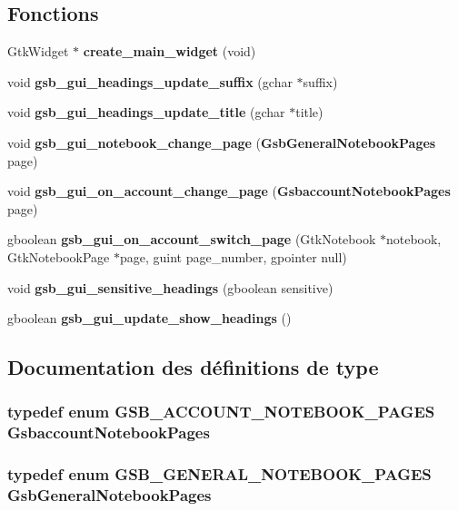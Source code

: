 \subsection*{Fonctions}
\begin{DoxyCompactItemize}
\item 
GtkWidget $\ast$ {\bf create\_\-main\_\-widget} (void)
\item 
void {\bf gsb\_\-gui\_\-headings\_\-update\_\-suffix} (gchar $\ast$suffix)
\item 
void {\bf gsb\_\-gui\_\-headings\_\-update\_\-title} (gchar $\ast$title)
\item 
void {\bf gsb\_\-gui\_\-notebook\_\-change\_\-page} ({\bf GsbGeneralNotebookPages} page)
\item 
void {\bf gsb\_\-gui\_\-on\_\-account\_\-change\_\-page} ({\bf GsbaccountNotebookPages} page)
\item 
gboolean {\bf gsb\_\-gui\_\-on\_\-account\_\-switch\_\-page} (GtkNotebook $\ast$notebook, GtkNotebookPage $\ast$page, guint page\_\-number, gpointer null)
\item 
void {\bf gsb\_\-gui\_\-sensitive\_\-headings} (gboolean sensitive)
\item 
gboolean {\bf gsb\_\-gui\_\-update\_\-show\_\-headings} ()
\end{DoxyCompactItemize}


\subsection{Documentation des définitions de type}
\subsubsection[{GsbaccountNotebookPages}]{\setlength{\rightskip}{0pt plus 5cm}typedef enum {\bf GSB\_\-ACCOUNT\_\-NOTEBOOK\_\-PAGES}  {\bf GsbaccountNotebookPages}}\label{fenetre__principale_8h_a52ecea0b75c8cf1a5b2dc61975676ff2}
\subsubsection[{GsbGeneralNotebookPages}]{\setlength{\rightskip}{0pt plus 5cm}typedef enum {\bf GSB\_\-GENERAL\_\-NOTEBOOK\_\-PAGES}  {\bf GsbGeneralNotebookPages}}\label{fenetre__principale_8h_a6e3a0b1ab242e7ceb5beeef96a6ac8f1}


